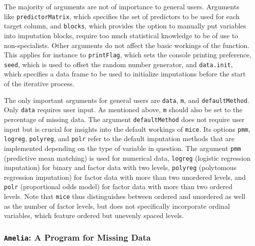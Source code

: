 \documentclass[12pt,econ]{sources/authesis}
\begin{document}
The majority of arguments are not of importance to general users. Arguments like \texttt{predictorMatrix}, which specifies the set of predictors to be used for each target column, and \texttt{blocks}, which provides the option to manually put variables into imputation blocks, require too much statistical knowledge to be of use to non-specialists. Other arguments do not affect the basic workings of the function. This applies for instance to \texttt{printFlag}, which sets the console printing preference, \texttt{seed}, which is used to offset the random number generator, and \texttt{data.init}, which specifies a data frame to be used to initialize imputations before the start of the iterative process.

The only important arguments for general users are \texttt{data}, \texttt{m}, and \texttt{defaultMethod}. Only \texttt{data} requires user input. As mentioned above, \texttt{m} should also be set to the percentage of missing data. The argument \texttt{defaultMethod} does not require user input but is crucial for insights into the default workings of \texttt{mice}. Its options \texttt{pmm}, \texttt{logreg}, \texttt{polyreg}, and \texttt{polr} refer to the default imputation methods that are implemented depending on the type of variable in question. The argument \texttt{pmm} (predictive mean matching) is used for numerical data, \texttt{logreg} (logistic regression imputation) for binary and factor data with two levels, \texttt{polyreg} (polytomous regression imputation) for factor data with more than two unordered levels, and \texttt{polr} (proportional odds model) for factor data with more than two ordered levels. Note that \texttt{mice} thus distinguishes between ordered and unordered as well as the number of factor levels, but does not specifically incorporate ordinal variables, which feature ordered but unevenly spaced levels.

\hypertarget{ordmiss-theory-multimpute-amelia}{%
\subsubsection{\texorpdfstring{\texttt{Amelia}: A Program for Missing Data}{Amelia: A Program for Missing Data}}\label{ordmiss-theory-multimpute-amelia}}
\end{document}
